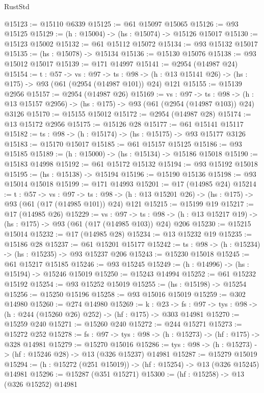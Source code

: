 \begin{lexlean}{RustStd}
\begin{coremodule}
@15123 := @15110 @6339
@15125 := @61 @15097 @15065
@15126 := @93 @15125
@15129 := (h : @15004) -> (hs : @15074) -> @15126 @15017
@15130 := @15123 @15002
@15132 := @61 @15112 @15072
@15134 := @93 @15132 @15017
@15135 := (hs : @15078) -> @15134
@15136 := @15130 @15076
@15138 := @93 @15012 @15017
@15139 := @171 @14997
@15141 := @2954 (@14987 @24)
@15154 := {t : @57} ->
  {vs : @97} ->
  {ts : @98} -> (h : @13 @15141 @26) -> (hs : @175) -> @93 (@61 (@2954 (@14987 @101)) @24) @121
@15155 := @15139 @2956
@15157 := @2954 (@14987 @26)
@15169 := {vs : @97} ->
  {ts : @98} -> (h : @13 @15157 @2956) -> (hs : @175) -> @93 (@61 (@2954 (@14987 @103)) @24) @3126
@15170 := @15155 @15012
@15172 := @2954 (@14987 @28)
@15174 := @13 @15172 @2956
@15175 := @15126 @28
@15177 := @61 @15141 @15117
@15182 := {ts : @98} -> (h : @15174) -> (hs : @15175) -> @93 @15177 @3126
@15183 := @15170 @15017
@15185 := @61 @15157 @15125
@15186 := @93 @15185
@15189 := (h : @15000) -> (hs : @15134) -> @15186 @15018
@15190 := @15183 @14998
@15192 := @61 @15172 @15132
@15194 := @93 @15192 @15018
@15195 := (hs : @15138) -> @15194
@15196 := @15190 @15136
@15198 := @93 @15014 @15018
@15199 := @171 @14993
@15201 := @17 (@14985 @24)
@15214 := {t : @57} ->
  {vs : @97} ->
  {ts : @98} -> (h : @13 @15201 @26) -> (hs : @175) -> @93 (@61 (@17 (@14985 @101)) @24) @121
@15215 := @15199 @19
@15217 := @17 (@14985 @26)
@15229 := {vs : @97} ->
  {ts : @98} -> (h : @13 @15217 @19) -> (hs : @175) -> @93 (@61 (@17 (@14985 @103)) @24) @206
@15230 := @15215 @15014
@15232 := @17 (@14985 @28)
@15234 := @13 @15232 @19
@15235 := @15186 @28
@15237 := @61 @15201 @15177
@15242 := {ts : @98} -> (h : @15234) -> (hs : @15235) -> @93 @15237 @206
@15243 := @15230 @15018
@15245 := @61 @15217 @15185
@15246 := @93 @15245
@15249 := (h : @14996) -> (hs : @15194) -> @15246 @15019
@15250 := @15243 @14994
@15252 := @61 @15232 @15192
@15254 := @93 @15252 @15019
@15255 := (hs : @15198) -> @15254
@15256 := @15250 @15196
@15258 := @93 @15016 @15019
@15259 := @302 @14980
@15260 := @274 @14980
@15269 := {k : @23} ->
  {fs : @97} -> {tys : @98} -> (h : @244 (@15260 @26) @252) -> (hf : @175) -> @303 @14981
@15270 := @15259 @240
@15271 := @15260 @240
@15272 := @244 @15271
@15273 := @15272 @252
@15278 := {fs : @97} -> {tys : @98} -> (h : @15273) -> (hf : @175) -> @328 @14981
@15279 := @15270 @15016
@15286 := {tys : @98} -> (h : @15273) -> (hf : @15246 @28) -> @13 (@326 @15237) @14981
@15287 := @15279 @15019
@15294 := (h : @15272 (@251 @15019)) -> (hf : @15254) -> @13 (@326 @15245) @14981
@15296 := @15287 (@351 @15271)
@15300 := (hf : @15258) -> @13 (@326 @15252) @14981

\end{coremodule}
\end{lexlean}
